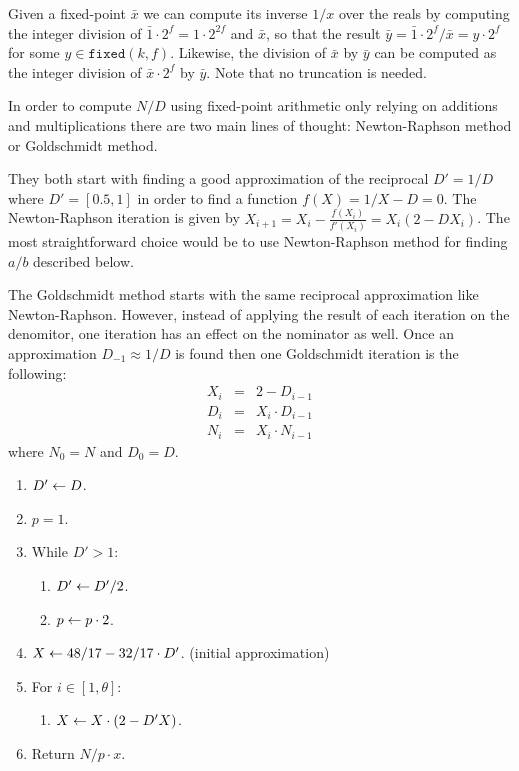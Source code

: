 Given a fixed-point $\bar{x}$ we can compute its inverse $1/x$ over the reals by
computing the integer division of $\bar{1} \cdot 2^f = 1 \cdot 2^{2f}$ and $\bar{x}$,
so that the result $\bar{y} = \bar{1} \cdot 2^f / \bar{x} = y \cdot 2^f$ for some
$y \in \mathtt{fixed}(k, f)$. Likewise, the division of $\bar{x}$ by $\bar{y}$ can
be computed as the integer division of $\bar{x} \cdot 2^f$ by $\bar{y}$. Note that
no truncation is needed.

In order to compute $N/D$ using fixed-point arithmetic only relying on additions
and multiplications there are two main lines of thought: Newton-Raphson method
or Goldschmidt method.

They both start with finding a good approximation of the reciprocal $D' = 1/D$
where $D' = [0.5, 1]$ in order to find a function $f(X) = 1/X - D = 0$. The
Newton-Raphson iteration is given by $X_{i+1} = X_i - \frac{f(X_i)}{f'(X_i)} =
X_i(2 - DX_i)$. The most straightforward choice would be to use Newton-Raphson
method for finding $a/b$ described below.

The Goldschmidt method starts with the same reciprocal approximation like
Newton-Raphson. However, instead of applying the result of each iteration on the
denomitor, one iteration has an effect on the nominator as well.  Once an
approximation $D_{-1} \approx 1/D$ is found then one Goldschmidt iteration is the
following:
\begin{eqnarray*}
X_i &=& 2 - D_{i-1} \\
D_i &=& X_i \cdot D_{i-1} \\
N_i &=& X_i \cdot N_{i-1}
\end{eqnarray*}
where $N_0 = N$ and $D_0 = D$.

\begin{enumerate}
  \item $D' \gets D$.
  \item $p = 1$.
  \item While $D' > 1$:
  \begin{enumerate}
    \item $D' \gets D' / 2$.
    \item $p \gets p \cdot 2$.
  \end{enumerate}
  \item $X \gets 48/17 - 32/17 \cdot D'$. (initial approximation)
  \item For $i \in [1, \theta]$:
  \begin{enumerate}
      \item $X \gets X \cdot (2 - D'X)$.
  \end{enumerate}
  \item Return $N / p \cdot x$.
\end{enumerate}



